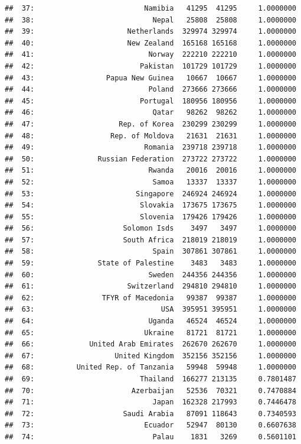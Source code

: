 \documentclass[10pt,]{article}
\begin{document}
\begin{verbatim}
##  37:                          Namibia   41295  41295     1.0000000
##  38:                            Nepal   25808  25808     1.0000000
##  39:                      Netherlands  329974 329974     1.0000000
##  40:                      New Zealand  165168 165168     1.0000000
##  41:                           Norway  222210 222210     1.0000000
##  42:                         Pakistan  101729 101729     1.0000000
##  43:                 Papua New Guinea   10667  10667     1.0000000
##  44:                           Poland  273666 273666     1.0000000
##  45:                         Portugal  180956 180956     1.0000000
##  46:                            Qatar   98262  98262     1.0000000
##  47:                    Rep. of Korea  230299 230299     1.0000000
##  48:                  Rep. of Moldova   21631  21631     1.0000000
##  49:                          Romania  239718 239718     1.0000000
##  50:               Russian Federation  273722 273722     1.0000000
##  51:                           Rwanda   20016  20016     1.0000000
##  52:                            Samoa   13337  13337     1.0000000
##  53:                        Singapore  246924 246924     1.0000000
##  54:                         Slovakia  173675 173675     1.0000000
##  55:                         Slovenia  179426 179426     1.0000000
##  56:                     Solomon Isds    3497   3497     1.0000000
##  57:                     South Africa  218019 218019     1.0000000
##  58:                            Spain  307861 307861     1.0000000
##  59:               State of Palestine    3483   3483     1.0000000
##  60:                           Sweden  244356 244356     1.0000000
##  61:                      Switzerland  294810 294810     1.0000000
##  62:                TFYR of Macedonia   99387  99387     1.0000000
##  63:                              USA  395951 395951     1.0000000
##  64:                           Uganda   46524  46524     1.0000000
##  65:                          Ukraine   81721  81721     1.0000000
##  66:             United Arab Emirates  262670 262670     1.0000000
##  67:                   United Kingdom  352156 352156     1.0000000
##  68:          United Rep. of Tanzania   59948  59948     1.0000000
##  69:                         Thailand  166277 213135     0.7801487
##  70:                       Azerbaijan   52536  70321     0.7470884
##  71:                            Japan  162328 217993     0.7446478
##  72:                     Saudi Arabia   87091 118643     0.7340593
##  73:                          Ecuador   52947  80130     0.6607638
##  74:                            Palau    1831   3269     0.5601101

\end{verbatim}
\end{document}
